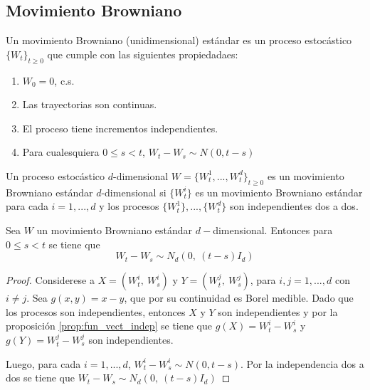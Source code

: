 \subsection{Movimiento Browniano}

\begin{definition}
    Un movimiento Browniano (unidimensional) estándar es un proceso 
    estocástico $\{W_t\}_{t\geq0}$ que cumple con las siguientes 
    propiedadaes:
    \begin{enumerate}
        \item $W_0=0$, c.s.
        \item Las trayectorias son continuas.
        \item El proceso tiene incrementos independientes. 
        \item Para cualesquiera $0\leq s<t$, $W_t-W_s\sim N(0,t-s)$
    \end{enumerate}
\end{definition}

\begin{definition}
    Un proceso estocástico $d$-dimensional $W = \{W_t^1,...,
    W_t^d\}_{t\geq 0}$ es un movimiento Browniano estándar
    $d$-dimensional si $\{W_t^i\}$ es un movimiento Browniano 
    estándar para cada $i=1,...,d$ y los procesos $\{W_t^1\},...,\{W_t^d\}$ 
    son independientes dos a dos.
\end{definition}

\begin{proposition}\label{prop:dist_saltos_MB}
    Sea $W$ un movimiento Browniano estándar $d-$dimensional. Entonces 
    para $0\leq s < t$ se tiene que 
    $$W_t-W_s \sim N_d(0,\ (t-s)I_d)$$
\end{proposition}

\begin{proof}
Considerese a $X=(W_t^i,\ W_s^i)$ y $Y=(W_t^j,\ W_s^j)$, para
$i,j=1,...,d$ con $i\not = j$. Sea $g(x,y)=x-y$, que por su 
continuidad es Borel medible. Dado que los procesos son independientes, 
entonces $X$ y $Y$ son independientes y por la proposición \ref{prop:fun_vect_indep}
se tiene que $g(X)=W_t^i-W_s^i$ y $g(Y)=W_t^j-W_s^j$ son independientes.

Luego, para cada $i=1,...,d$, $W_t^i-W_s^i\sim N(0, t-s)$. Por la 
independencia dos a dos se tiene que $W_t-W_s \sim N_d(0,\ (t-s)I_d)$
\end{proof}

